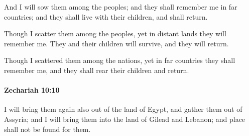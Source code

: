 			\begin{versebox}
					\item[BHS] 
					\item[LXX] 
					\item[ASV] And I will sow them among the peoples; and they shall remember me in far countries; and they shall live with their children, and shall return.
					\item[NIV] Though I scatter them among the peoples, yet in distant lands they will remember me. They and their children will survive, and they will return.
					\item[NRSV] Though I scattered them among the nations, yet in far countries they shall remember me, and they shall rear their children and return.
			\end{versebox}

		\paragraph{Zechariah 10:10} %
			\label{ZECHARIAH-10-10}

			I will bring them again also out of the land of Egypt, and gather them out of Assyria; and I will bring them into the land of Gilead and Lebanon; and place shall not be found for them.

